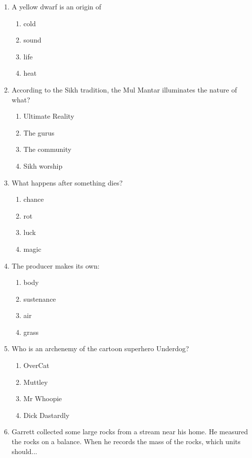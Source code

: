 \documentclass[12pt]{article}
\begin{document}
\begin{enumerate}[label=\arabic*.]
\begin{enumerate}[label=(\alph*)]
    \item all
\end{enumerate}
\item A yellow dwarf is an origin of
\begin{enumerate}[label=(\alph*)]
    \item cold
    \item sound
    \item life
    \item heat
\end{enumerate}
\item According to the Sikh tradition, the Mul Mantar illuminates the nature of what?
\begin{enumerate}[label=(\alph*)]
    \item Ultimate Reality
    \item The gurus
    \item The community
    \item Sikh worship
\end{enumerate}
\item What happens after something dies?
\begin{enumerate}[label=(\alph*)]
    \item chance
    \item rot
    \item luck
    \item magic
\end{enumerate}
\item The producer makes its own:
\begin{enumerate}[label=(\alph*)]
    \item body
    \item sustenance
    \item air
    \item grass
\end{enumerate}
\item Who is an archenemy of the cartoon superhero Underdog?
\begin{enumerate}[label=(\alph*)]
    \item OverCat
    \item Muttley
    \item Mr Whoopie
    \item Dick Dastardly
\end{enumerate}
\item Garrett collected some large rocks from a stream near his home. He measured the rocks on a balance. When he records the mass of the rocks, which units should...
\begin{enumerate}[label=(\alph*)]

\end{enumerate}
\end{enumerate}
\end{document}
